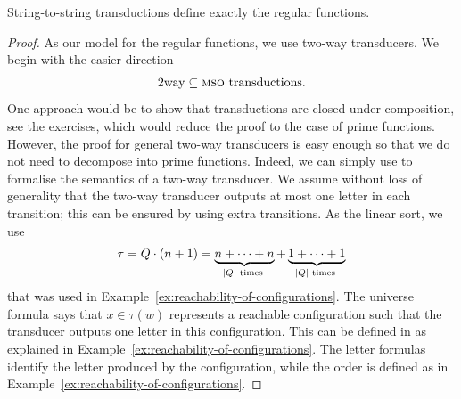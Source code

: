 \begin{theorem}\label{thm:logic-regular-functions}
    String-to-string \mso transductions define exactly the regular functions.
\end{theorem}
\begin{proof} As our model for the regular functions, we use two-way transducers. 
    We begin with the easier direction 
    \begin{align*}
    \mathrm{2way} \subseteq {\textsc{mso}} \text{ transductions}.
    \end{align*}
One approach would be to show that \mso transductions are closed under composition, see the exercises, which would reduce the proof to the case of prime functions. However, the proof for general two-way transducers is easy enough so that we do not need to decompose into prime functions. Indeed, we can simply use \mso to formalise the semantics of a two-way transducer. We assume without loss of generality that the two-way transducer outputs at most one letter in each transition; this can be ensured by using extra transitions.  As the linear sort, we use 
    \begin{align*}
    \tau = Q \cdot (n +1) = 
    \myunderbrace{n + \cdots + n}{$|Q|$ times} + 
    \myunderbrace{1 + \cdots + 1}{$|Q|$ times}
    \end{align*}
    that was used in Example~\ref{ex:reachability-of-configurations}. The universe formula says that $x \in \tau(w)$ represents a reachable configuration such that the transducer outputs one letter in this configuration. This can be defined in \mso as explained in Example~\ref{ex:reachability-of-configurations}. The letter formulas identify the letter produced by the configuration, while the order is defined as in Example~\ref{ex:reachability-of-configurations}.


\end{proof}
